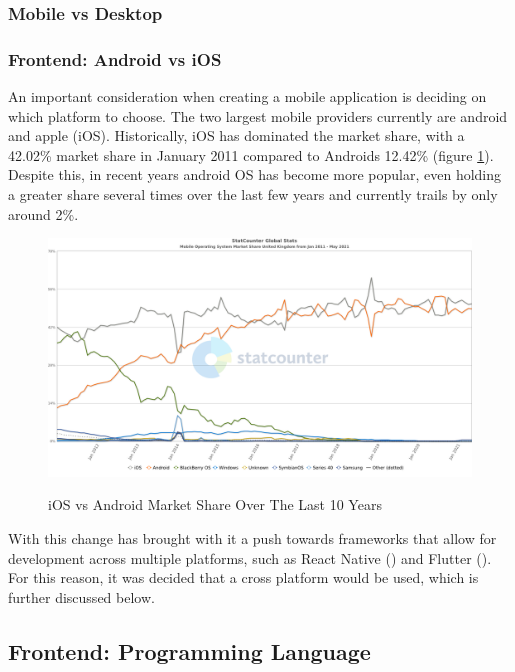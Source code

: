 \documentclass[12pt]{article}
\begin{document}
	\subsubsection{Mobile vs Desktop}
	
	\subsubsection{Frontend: Android vs iOS}
	An important consideration when creating a mobile application is deciding on which platform to choose. The two largest mobile providers currently are android and apple (iOS). Historically, iOS has dominated the market share, with a 42.02\% market share in January 2011 compared to Androids 12.42\% (figure \ref{fig:ios-android}). Despite this, in recent years android OS has become more popular, even holding a greater share several times over the last few years and currently trails by only around 2\%.
	
	\begin{figure}[H]
		\centering
		\includegraphics[scale=0.4]{images/ios-android.png}
		\caption{iOS vs Android Market Share Over The Last 10 Years}
		\label{fig:ios-android}
		\cite{stat-counter-21}
	\end{figure}
	
	With this change has brought with it a push towards frameworks that allow for development across multiple platforms, such as React Native (\cite{https://reactnative.dev/}) and Flutter (\cite{flutter.dev}). For this reason, it was decided that a cross platform would be used, which is further discussed below.
	
	\subsection{Frontend: Programming Language}
\end{document}
